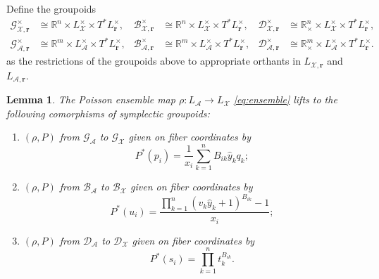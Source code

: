 \documentclass{amsart}
\newtheorem{lemma}[theorem]{Lemma}
\numberwithin{equation}{section}
\newcommand{\bfr}{{\boldsymbol{r}}}
\newcommand{\cA}{\mathcal{A}}
\newcommand{\cB}{\mathcal{B}}
\newcommand{\cD}{\mathcal{D}}
\newcommand{\cG}{\mathcal{G}}
\newcommand{\cX}{\mathcal{X}}
\newcommand{\RR}{\mathbb{R}}
\begin{document}
Define the groupoids 
\begin{align*}
  \cG^\times_{\cX,\bfr}&\cong\RR^n\times L^\times_\cX\times T^*L^\times_\bfr,& \cB^\times_{\cX,\bfr}&\cong\RR^n\times L^\times_\cX\times T^*L^\times_\bfr,& \cD^\times_{\cX,\bfr}&\cong\RR_\times^n\times L^\times_\cX\times T^*L^\times_\bfr,\\
  \cG^\times_{\cA,\bfr}&\cong\RR^m\times L^\times_\cA\times T^*L^\times_\bfr,& \cB^\times_{\cA,\bfr}&\cong\RR^m\times L^\times_\cA\times T^*L^\times_\bfr,& \cD^\times_{\cA,\bfr}&\cong\RR_\times^m\times L^\times_\cA\times T^*L^\times_\bfr.
\end{align*}
as the restrictions of the groupoids above to appropriate orthants in $L_{\cX,\bfr}$ and $L_{\cA,\bfr}$.
\begin{lemma} \label{lemma:ensemblegpd}
  The Poisson ensemble map $\rho:L_\cA\to L_\cX$ \eqref{eq:ensemble} lifts to the following comorphisms of symplectic groupoids:
  \begin{enumerate}
    \item $(\rho, P)$ from $\cG_\cA$ to $\cG_\cX$ given on fiber coordinates by
      \begin{equation} \label{eq:ensembleG}
	P^*\!\left(p_i\right) = \frac{1}{x_i}\sum_{k=1}^n B_{ik} \hat{y}_k q_k;
      \end{equation}
    \item $(\rho, P)$ from $\cB_\cA$ to $\cB_\cX$ given on fiber coordinates by
      \[P^*\!\left(u_i\right) = \frac{\prod_{k=1}^n (v_k\hat{y}_k+1)^{B_{ik}} - 1}{x_i};\]
    \item $(\rho, P)$ from $\cD_\cA$ to $\cD_\cX$ given on fiber coordinates by
      \[P^*\!\left(s_i \right) = \prod_{k=1}^n t_k^{B_{ik}}.\]
  \end{enumerate}
\end{lemma}
\end{document}
